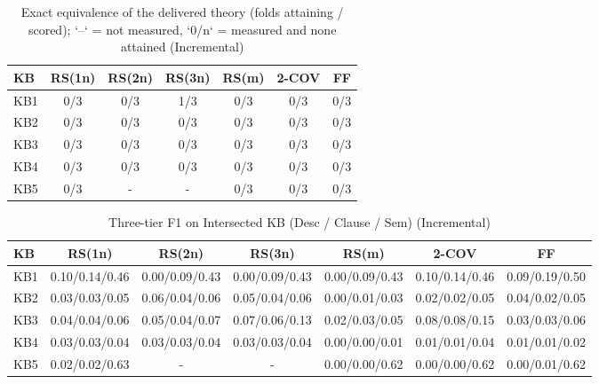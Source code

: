 \begin{table}[htbp]
\centering
\caption{Exact equivalence of the delivered theory (folds attaining / scored); `--` = not measured, `0/n` = measured and none attained (Incremental)}
\label{tab:exact_equiv_incremental}
\begin{tabular}{lcccccc}
\toprule
KB & RS(1n) & RS(2n) & RS(3n) & RS(m) & 2-COV & FF \\
\midrule
KB1 & 0/3 & 0/3 & 1/3 & 0/3 & 0/3 & 0/3 \\
KB2 & 0/3 & 0/3 & 0/3 & 0/3 & 0/3 & 0/3 \\
KB3 & 0/3 & 0/3 & 0/3 & 0/3 & 0/3 & 0/3 \\
KB4 & 0/3 & 0/3 & 0/3 & 0/3 & 0/3 & 0/3 \\
KB5 & 0/3 & - & - & 0/3 & 0/3 & 0/3 \\
\bottomrule
\end{tabular}
\end{table}

\begin{table}[htbp]
\centering
\caption{Three-tier F1 on Intersected KB (Desc / Clause / Sem) (Incremental)}
\label{tab:three_tier_f1_incremental}
\begin{tabular}{lcccccc}
\toprule
KB & RS(1n) & RS(2n) & RS(3n) & RS(m) & 2-COV & FF \\
\midrule
KB1 & 0.10/0.14/0.46 & 0.00/0.09/0.43 & 0.00/0.09/0.43 & 0.00/0.09/0.43 & 0.10/0.14/0.46 & 0.09/0.19/0.50 \\
KB2 & 0.03/0.03/0.05 & 0.06/0.04/0.06 & 0.05/0.04/0.06 & 0.00/0.01/0.03 & 0.02/0.02/0.05 & 0.04/0.02/0.05 \\
KB3 & 0.04/0.04/0.06 & 0.05/0.04/0.07 & 0.07/0.06/0.13 & 0.02/0.03/0.05 & 0.08/0.08/0.15 & 0.03/0.03/0.06 \\
KB4 & 0.03/0.03/0.04 & 0.03/0.03/0.04 & 0.03/0.03/0.04 & 0.00/0.00/0.01 & 0.01/0.01/0.04 & 0.01/0.01/0.02 \\
KB5 & 0.02/0.02/0.63 & - & - & 0.00/0.00/0.62 & 0.00/0.00/0.62 & 0.00/0.01/0.62 \\
\bottomrule
\end{tabular}
\end{table}


